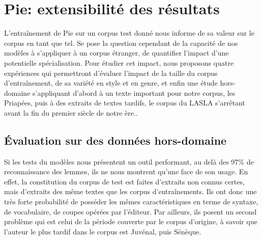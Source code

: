 \section{Pie: extensibilité des résultats}

L'entraînement de Pie sur un corpus test donné nous informe de sa valeur sur le corpus en tant que tel. Se pose la question cependant de la capacité de nos modèles à s'appliquer à un corpus étranger, de quantifier l'impact d'une potentielle spécialisation. Pour étudier cet impact, nous proposons quatre expériences qui permettront d'évaluer l'impact de la taille du corpus d'entraînement, de sa variété en style et en genre, et enfin une étude hors-domaine s'appliquant d'abord à un texte important pour notre corpus, les Priapées, puis à des extraits de textes tardifs, le corpus du LASLA s'arrêtant avant la fin du premier siècle de notre ère..

\subsection{Évaluation sur des données hors-domaine}

Si les tests du modèles nous présentent un outil performant, au delà des 97\% de reconnaissance des lemmes, ils ne nous montrent qu'une face de son usage. En effet, la constitution du corpus de test est faites d'extraits non connus certes, mais d'extraits des même textes que les corpus d'entraînements. Ils ont donc une très forte probabilité de posséder les mêmes caractéristiques en terme de syntaxe, de vocabulaire, de coupes opérées par l'éditeur. Par ailleurs, ils posent un second problème qui est celui de la période couverte par le corpus d'origine, à savoir que l'auteur le plus tardif dans le corpus est Juvénal, puis Sénèque.

